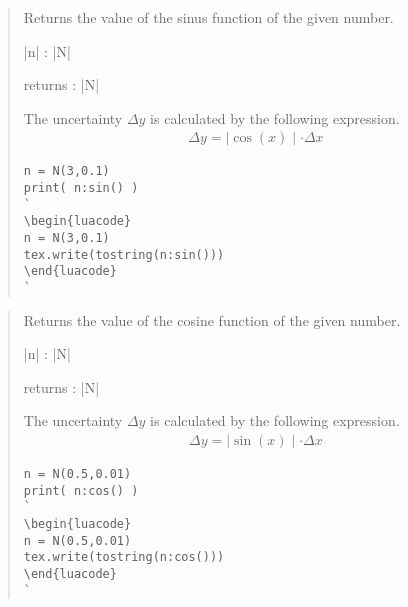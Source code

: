 \documentclass{ltxdoc}
\begin{document}
\begin{quote}
  Returns the value of the sinus function of the given number.

  \begin{description}
  \item |n| : |N|

  \item returns : |N|
  \end{description}

  The uncertainty $\Delta y$ is calculated by the following expression.
  \begin{align*}
    \Delta y = \mid \cos(x) \mid \cdot \Delta x
  \end{align*}  


\begin{lstlisting}
n = N(3,0.1)
print( n:sin() )
`
\begin{luacode}
n = N(3,0.1)
tex.write(tostring(n:sin()))
\end{luacode}
`
\end{lstlisting}

\end{quote}


\begin{quote}
  Returns the value of the cosine function of the given number.

  \begin{description}
  \item |n| : |N|

  \item returns : |N|
  \end{description}

  The uncertainty $\Delta y$ is calculated by the following expression.
  \begin{align*}
    \Delta y = \mid \sin(x) \mid \cdot \Delta x
  \end{align*}  


\begin{lstlisting}
n = N(0.5,0.01)
print( n:cos() )
`
\begin{luacode}
n = N(0.5,0.01)
tex.write(tostring(n:cos()))
\end{luacode}
`
\end{lstlisting}

\end{quote}
\end{document}
